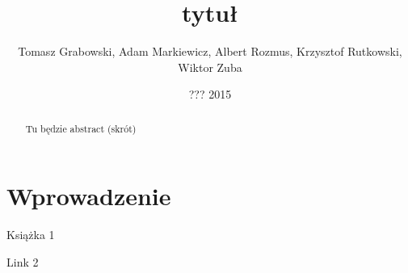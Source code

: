 \documentclass[licencjacka]{pracamgr}
\author{Tomasz Grabowski, Adam Markiewicz, Albert Rozmus, Krzysztof Rutkowski, Wiktor Zuba}
\title{tytuł}
\date{??? 2015}
\begin{document}
\maketitle

\begin{abstract}
Tu będzie abstract (skrót)
\end{abstract}


\tableofcontents

\chapter*{Wprowadzenie}

\begin{thebibliography}{99}

 Książka 1

 Link 2

\end{thebibliography}
\end{document}
